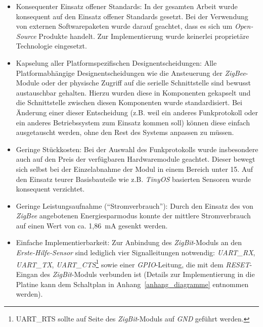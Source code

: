 \begin{itemize}
    \item{Konsequenter Einsatz offener Standards:} In der gesamten Arbeit wurde konsequent auf den
          Einsatz offener Standards gesetzt. Bei der Verwendung von externen Softwarepaketen wurde
          darauf geachtet, dass es sich um \emph{Open-Source} Produkte handelt. Zur Implementierung
          wurde keinerlei proprietäre Technologie eingesetzt.

    \item{Kapselung aller Platformspezifischen Designentscheidungen:} Alle Platformabhängige
          Designentscheidungen wie die Ansteuerung der \emph{ZigBee}-Module oder der
          physische Zugriff auf die serielle Schnittstelle sind bewusst austauschbar gehalten.
          Hierzu wurden diese in Komponenten gekapselt und die Schnittstelle zwischen diesen
          Komponenten wurde standardisiert. Bei Änderung einer dieser Entscheidung (z.B.
          weil ein anderes Funkprotokoll oder ein anderes Betriebssystem zum Einsatz kommen soll)
          können diese einfach ausgetauscht werden, ohne den Rest des Systems anpassen zu 
          müssen.

    \item{Geringe Stückkosten:} Bei der Auswahl des Funkprotokolls wurde insbesondere auch auf den
          Preis der verfügbaren Hardwaremodule geachtet. Dieser bewegt sich selbst bei der
          Einzelabnahme der Modul in einem Bereich unter 15\EUR{}. Auf den Einsatz teurer
          Basisbauteile wie z.B. \emph{TinyOS} basierten Sensoren wurde konsequent verzichtet.

    \item{Geringe Leistungsaufnahme ("`Stromverbrauch"'):} Durch den Einsatz des von \emph{ZigBee}
          angebotenen Energiesparmodus konnte der mittlere Stromverbrauch auf einen Wert von ca. 
          1,86~mA gesenkt werden.

    \item{Einfache Implementierbarkeit:} Zur Anbindung des \emph{ZigBit}-Moduls an den \emph{Erste-Hilfe-Sensor}
          sind lediglich vier Signalleitungen notwendig: \emph{UART\_RX}, \emph{UART\_TX}, 
          \emph{UART\_CTS}\footnote{UART\_RTS sollte auf Seite des \emph{ZigBit}-Moduls auf \emph{GND}
              geführt werden.} sowie einer \emph{GPIO}-Leitung, die mit dem \emph{RESET}-Eingan des
          \emph{ZigBit}-Moduls verbunden ist (Details zur Implementierung in die Platine kann dem
          Schaltplan in Anhang~\ref{anhang_diagramme} entnommen werden). 


\end{itemize}
